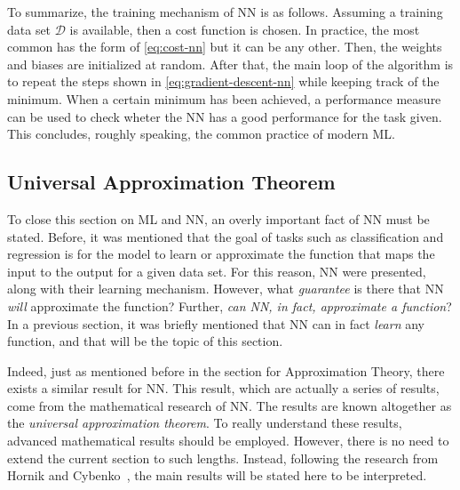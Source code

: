 To summarize, the training mechanism of NN is as follows. Assuming a training data set 
\(\mathcal{D}\) is available, then a cost function is chosen. In practice, the most common 
has the form of \autoref{eq:cost-nn} but it can be any other. Then, the weights and biases 
are initialized at random. After that, the main loop of the algorithm is to repeat the 
steps shown in \autoref{eq:gradient-descent-nn} while keeping track of the minimum. When a 
certain minimum has been achieved, a performance measure can be used to check wheter the NN 
has a good performance for the task given. This concludes, roughly speaking, the common 
practice of modern ML.

\subsection{Universal Approximation Theorem} \label{sec:approximation-thm}
To close this section on ML and NN, an overly important fact of NN must be stated. Before, 
it was mentioned that the goal of tasks such as classification and regression is for the 
model to learn or approximate the function that maps the input to the output for a given 
data set. For this reason, NN were presented, along with their learning mechanism. However, 
what \emph{guarantee} is there that NN \emph{will} approximate the function? Further, 
\emph{can NN, in fact, approximate a function}? In a previous section, it was briefly 
mentioned that NN can in fact \emph{learn} any function, and that will be the topic of this 
section.

Indeed, just as mentioned before in the section for Approximation Theory, there exists a 
similar result for NN. This result, which are actually a series of results, come from the 
mathematical research of NN. The results are known altogether as the \emph{universal 
approximation theorem}. To really understand these results, advanced mathematical results 
should be employed. However, there is no need to extend the current section to such 
lengths. Instead, following the research from Hornik and Cybenko~\cite{hornikMultilayerFeedforwardNetworks1989, hornikApproximationCapabilitiesMultilayer1991, cybenkoApproximationSuperpositionsSigmoidal1989}, 
the main results will be stated here to be interpreted.

